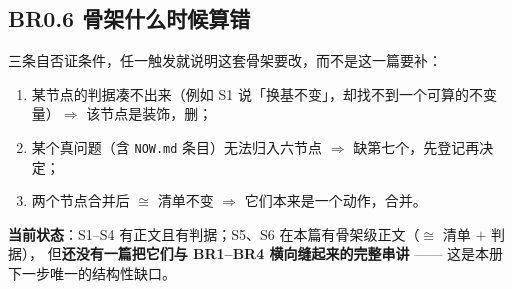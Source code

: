 \subsection{BR0.6 骨架什么时候算错}

三条自否证条件，任一触发就说明这套骨架要改，而不是这一篇要补：

\begin{enumerate}[leftmargin=1.5em]
  \item 某节点的判据凑不出来（例如 S1 说「换基不变」，却找不到一个可算的不变量）$\Rightarrow$ 该节点是装饰，删；
  \item 某个真问题（含 \texttt{NOW.md} 条目）无法归入六节点 $\Rightarrow$ 缺第七个，先登记再决定；
  \item 两个节点合并后 $\cong$ 清单不变 $\Rightarrow$ 它们本来是一个动作，合并。
\end{enumerate}

\textbf{当前状态}：S1–S4 有正文且有判据；S5、S6 在本篇有骨架级正文（$\cong$ 清单 $+$ 判据），
但\textbf{还没有一篇把它们与 BR1–BR4 横向缝起来的完整串讲} —— 这是本册下一步唯一的结构性缺口。